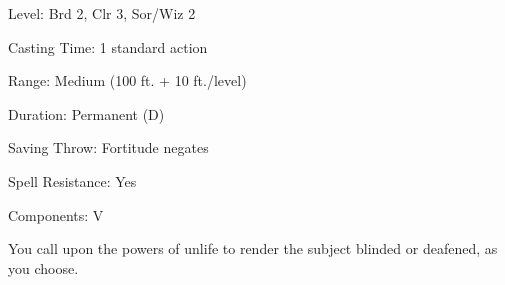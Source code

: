 
\begin{description*}
\item[Level:] Brd 2, Clr 3, Sor/Wiz 2
\item[Casting Time:] 1 standard action
\item[Range:] Medium (100 ft. + 10 ft./level)
\item[Duration:] Permanent (D)
\item[Saving Throw:] Fortitude negates
\item[Spell Resistance:] Yes
\item[Components:] V
\end{description*}

You call upon the powers of unlife to render the subject blinded or deafened, as
you choose.